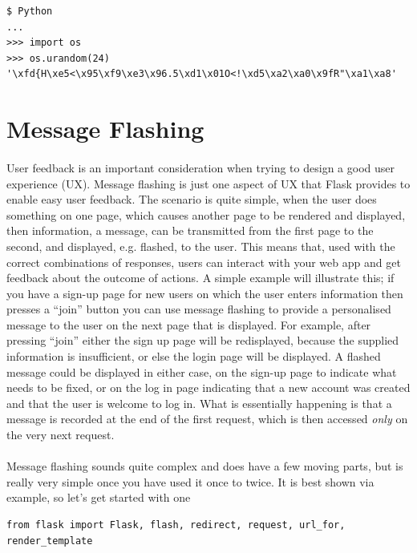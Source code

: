 \documentclass[12pt, a4paper, oneside]{book}
\begin{document}
{\begin{lstlisting}
$ Python
...
>>> import os
>>> os.urandom(24)
'\xfd{H\xe5<\x95\xf9\xe3\x96.5\xd1\x01O<!\xd5\xa2\xa0\x9fR"\xa1\xa8'
\end{lstlisting}


\section{Message Flashing}
\label{message-flashing}
\paragraph{} User feedback is an important consideration when trying to design a good user experience (UX). Message flashing is just one aspect of UX that Flask provides to enable easy user feedback. The scenario is quite simple, when the user does something on one page, which causes another page to be rendered and displayed, then information, a message, can be transmitted from the first page to the second, and displayed, e.g. flashed, to the user. This means that, used with the correct combinations of responses, users can interact with your web app and get feedback about the outcome of actions. A simple example will illustrate this; if you have a sign-up page for new users on which the user enters information then presses a ``join'' button you can use message flashing to provide a personalised message to the user on the next page that is displayed. For example, after pressing ``join'' either the sign up page will be redisplayed, because the supplied information is insufficient, or else the login page will be displayed. A flashed message could be displayed in either case, on the sign-up page to indicate what needs to be fixed, or on the log in page indicating that a new account was created and that the user is welcome to log in. What is essentially happening is that a message is recorded at the end of the first request, which is then accessed \emph{only} on the very next request.

\paragraph{} Message flashing sounds quite complex and does have a few moving parts, but is really very simple once you have used it once to twice. It is best shown via example, so let's get started with one

\begin{lstlisting}
from flask import Flask, flash, redirect, request, url_for, render_template


\end{lstlisting}}
\end{document}
